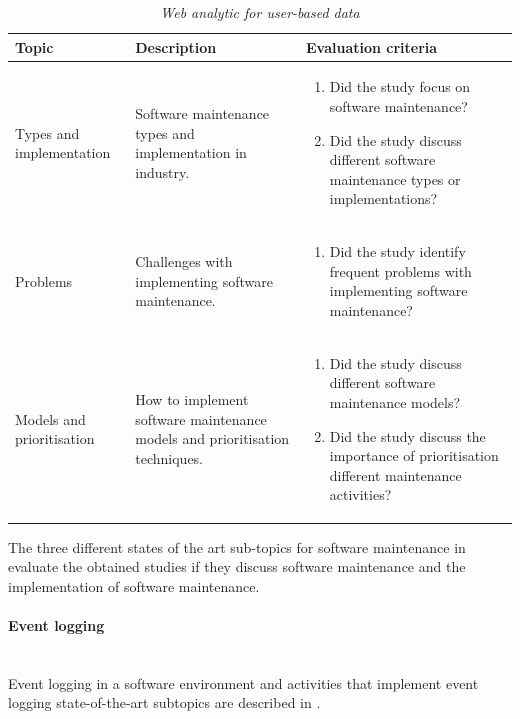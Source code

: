 \begin{table}[!htb]
	\centering
	\caption[Software maintenance state of the art sub topics]
	{\textit{Web analytic for user-based data}}
	\label{tbl:ch1_soaSoftwareMaintennace}
	\begin{tabularx}{\linewidth}{|l|X|X|}
		\hline \textbf{Topic}  & \textbf{Description} & \textbf{Evaluation criteria}\\
		\hline Types and implementation & \RaggedRight Software maintenance types and implementation in industry. & \RaggedRight \begin{enumerate}
			\item Did the study focus on software maintenance?
			\item Did the study discuss different software maintenance types or implementations?
		\end{enumerate} \\
		\hline Problems & Challenges with implementing software maintenance. & \RaggedRight \begin{enumerate}
			\item Did the study identify frequent problems with implementing software maintenance?
		\end{enumerate}\\
		\hline Models and prioritisation & How to implement software maintenance models and prioritisation techniques. & \RaggedRight \begin{enumerate}
			\item Did the study discuss different software maintenance models?
			\item Did the study discuss the importance of prioritisation different maintenance activities?
		\end{enumerate} \\
		\hline
	\end{tabularx}
\end{table}

\clearpage

The three different states of the art sub-topics for software maintenance in  evaluate the obtained studies if they discuss software maintenance and the implementation of software maintenance.

\paragraph{Event logging} \leavevmode\\
Event logging in a software environment and activities that implement event logging state-of-the-art subtopics are described in .

